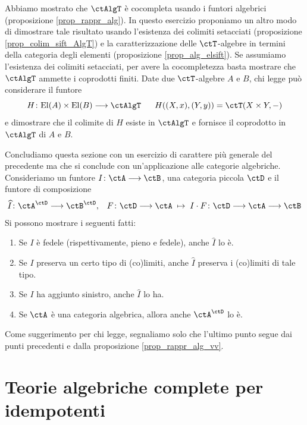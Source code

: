 \begin{exercise}\label{ex_AlgT_cocompl}
 Abbiamo mostrato che \(\ctAlgT\) è cocompleta usando i funtori algebrici (proposizione \ref{prop_rappr_alg}).
 In questo esercizio proponiamo un altro modo di dimostrare tale risultato usando l'esistenza dei colimiti setacciati
 (proposizione \ref{prop_colim_sift_AlgT}) e la
 caratterizzazione delle \(\ctT\)-algebre in termini della categoria degli elementi (proposizione \ref{prop_alg_elsift}).
 Se assumiamo l'esistenza dei colimiti setacciati, per avere la cocompletezza basta mostrare che \(\ctAlgT\) ammette
 i coprodotti finiti. Date due \(\ctT\)-algebre \(A\) e \(B\), chi legge può considerare il funtore
 \[H \colon \mathrm{El}(A) \times \mathrm{El}(B) \fun \ctAlgT \;\;\;\;\;\; H((X,x),(Y,y)) = \ctT(X \times Y,-)\]
 e dimostrare che il colimite di \(H\) esiste in \(\ctAlgT\) e fornisce il coprodotto in \(\ctAlgT\) di \(A\) e \(B\).
\end{exercise}

\begin{exercise}\label{ex_alg_exp}
 Concludiamo questa sezione con un esercizio di carattere più generale del precedente ma che si conclude con
 un'applicazione alle categorie algebriche. Consideriamo un funtore \(I \colon \ctA \fun \ctB\), una categoria piccola
 \(\ctD\) e il funtore di composizione
 \[ \widehat{I} \colon \ctA^{\ctD} \fun \ctB^{\ctD}, \;\;\;  F \colon \ctD \fun \ctA \;\mapsto\; I \cmp F \colon \ctD \fun \ctA \fun \ctB \]
 Si possono mostrare i seguenti fatti:
 \begin{enumerate}
  \item Se \(I\) è fedele (rispettivamente, pieno e fedele), anche \(\widehat{I}\) lo è.
  \item Se \(I\) preserva un certo tipo di (co)limiti, anche \(\widehat{I}\) preserva i (co)limiti di tale tipo.
  \item Se \(I\) ha aggiunto sinistro, anche \(\widehat{I}\) lo ha.
  \item Se \(\ctA\) è una categoria algebrica, allora anche \(\ctA^{\ctD}\) lo è.
 \end{enumerate}
 Come suggerimento per chi legge, segnaliamo solo che l'ultimo punto segue dai punti precedenti e dalla proposizione
 \ref{prop_rappr_alg_vv}.
\end{exercise}

\section{Teorie algebriche complete per idempotenti}

